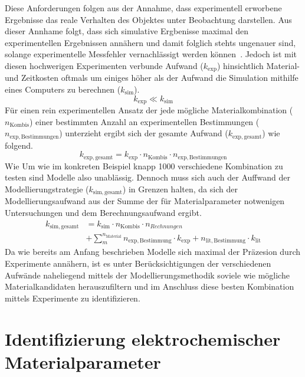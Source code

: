 Diese Anforderungen folgen aus der Annahme, dass experimentell erworbene Ergebnisse das reale Verhalten des Objektes unter Beobachtung darstellen. Aus dieser Annhame folgt, dass sich simulative Ergbenisse maximal den experimentellen Ergebnissen annähern und damit folglich stehts ungenauer sind, solange experimentelle Messfehler vernachlässigt werden können~\cite{Morris2024}. Jedoch ist mit diesen hochwerigen Experimenten verbunde Aufwand ($k_{\mathrm{exp}}$) hinsichtlich Material-  und Zeitkosten oftmals um einiges höher als der Aufwand die Simulation mithilfe eines Computers zu berechnen ($k_{\mathrm{sim}}$).
\begin{equation}
    k_{\mathrm{exp}} \ll k_{\mathrm{sim}} 
\end{equation}
Für einen rein experimentellen Ansatz der jede mögliche Materialkombination ($n_{\mathrm{Kombis}}$) einer bestimmten Anzahl an experimentellen Bestimmungen ($n_{\mathrm{exp,Bestimmungen}}$) unterzieht ergibt sich der gesamte Aufwand ($k_{\mathrm{exp, gesamt}}$) wie folgend.
\begin{equation}
    k_{\mathrm{exp, gesamt}} = k_{\mathrm{exp}} \cdot n_{\mathrm{Kombis}} \cdot n_{\mathrm{exp,Bestimmungen}}
\end{equation}
Wie 
Um wie im konkreten Beispiel knapp 1000 verschiedene Kombination zu testen sind Modelle also unablässig. Dennoch muss sich auch der Auffwand der Modellierungstrategie ($k_{\mathrm{sim, gesamt}}$) in Grenzen halten, da sich der Modellierungsaufwand aus der Summe der für Materialparameter notwenigen Untersuchungen und dem Berechnungsaufwand ergibt.
\begin{align}
    k_{\mathrm{sim, gesamt}} &= k_{\mathrm{sim}} \cdot n_{\mathrm{Kombis}} \cdot n_{Rechnungen} \nonumber \\
    &+ \sum_{m}^{n_{\mathrm{Material}}} n_{\mathrm{exp, Bestimmung}} \cdot k_{\mathrm{exp}} + n_{\mathrm{lit, Bestimmung}} \cdot k_{\mathrm{lit}} 
\end{align}
Da wie bereits am Anfang beschrieben Modelle sich maximal der Präzesion durch Experimente annähern, ist es unter Berücksichtigungen der verschiedenen Aufwände naheliegend mittels der Modellierungsmethodik soviele wie mögliche Materialkandidaten herauszufiltern und im Anschluss diese besten Kombination mittels Experimente zu identifizieren.


\section{\label{sec:improve_elchem}Identifizierung elektrochemischer Materialparameter}

